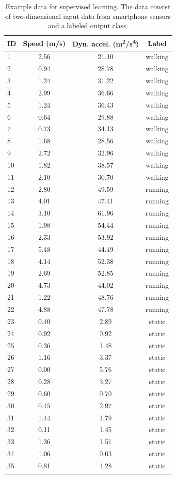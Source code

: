 \begin{table}
\caption[Example data for supervised learning]{Example data for supervised learning. The data consist of two-dimensional input data from smartphone sensors and a labeled output class.}\label{table:data-from-phone}
\centering
\begin{tabular}{lccc}
\hline\noalign{\smallskip}
\textbf{ID} & \textbf{Speed (m/s)} & \textbf{Dyn. accel. (m\textsuperscript{2}/s\textsuperscript{4})} & \textbf{Label}\\
\hline\noalign{\smallskip}
1 & 2.56 & 21.10 & walking\\
2 & 0.94 & 28.78 & walking\\
3 & 1.24 & 31.22 & walking\\
4 & 2.99 & 36.66 & walking\\
5 & 1.24 & 36.43 & walking\\
6 & 0.64 & 29.88 & walking\\
7 & 0.73 & 34.13 & walking\\
8 & 1.68 & 28.56 & walking\\
9 & 2.72 & 32.96 & walking\\
10 & 1.82 & 38.57 & walking\\
11 & 2.10 & 30.70 & walking\\
12 & 2.80 & 49.59 & running\\
13 & 4.01 & 47.41 & running\\
14 & 3.10 & 61.96 & running\\
15 & 1.98 & 54.44 & running\\
16 & 2.33 & 53.92 & running\\
17 & 5.48 & 44.49 & running\\
18 & 4.14 & 52.38 & running\\
19 & 2.69 & 52.85 & running\\
20 & 4.73 & 44.02 & running\\
21 & 1.22 & 48.76 & running\\
22 & 4.88 & 47.78 & running\\
23 & 0.40 & 2.89 & static\\
24 & 0.92 & 0.92 & static\\
25 & 0.36 & 1.48 & static\\
26 & 1.16 & 3.37 & static\\
27 & 0.00 & 5.76 & static\\
28 & 0.28 & 3.27 & static\\
29 & 0.60 & 0.70 & static\\
30 & 0.45 & 2.97 & static\\
31 & 1.44 & 1.79 & static\\
32 & 0.11 & 1.45 & static\\
33 & 1.36 & 1.51 & static\\
34 & 1.06 & 0.03 & static\\
35 & 0.81 & 1.28 & static\\
\hline\noalign{\smallskip}
%
\end{tabular}
\end{table}
